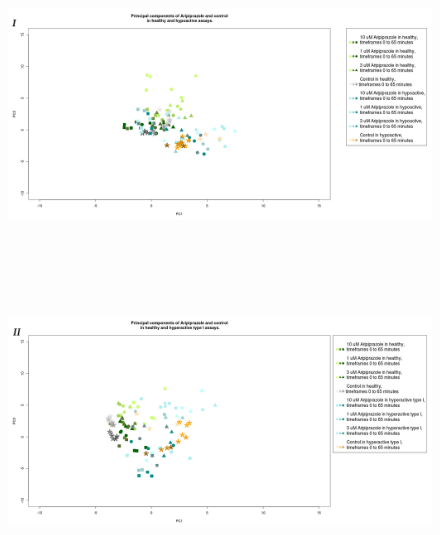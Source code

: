 \documentclass[a4paper,12pt]{article}
\begin{document}
\begin{figure}[h!]
\begin{center}
\includegraphics[width=16cm,height=8cm]{Aripiprazole_Control_DarkApoLow.png}
\includegraphics[width=16cm,height=8cm]{Aripiprazole_Control_DarkApoHigh.png}
\end{center}
\end{figure}
\newpage
\end{document}
